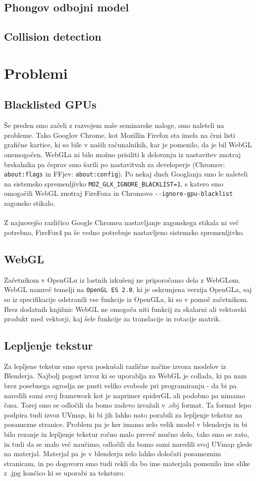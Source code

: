 \documentclass[10pt,a4paper]{article}
\begin{document}
\subsection{Phongov odbojni model}
\subsection{Collision detection}
\pagebreak
\section{Problemi}
\subsection{Blacklisted GPUs}
Še preden smo začeli z razvojem naše seminarske naloge, smo naleteli na probleme.
Tako Googlov Chrome, kot Mozillin Firefox sta imela na črni listi grafične kartice,
ki so bile v naših računalnikih, kar je pomenilo, da je bil WebGL onemogočen. 
WebGLa ni bilo možno prisiliti k delovanju iz nastavitev znotraj brskalnika pa 
čeprav smo šarili po nastavitvah za developerje (Chromov: \verb|about:flags| in FFjev: \verb|about:config|).
Po nekaj dneh Googlanja smo le naleteli na sistemsko spremenljivko \verb|MOZ_GLX_IGNORE_BLACKLIST=1|,
s katero smo omogočili WebGL znotraj FireFoxa in Chromovo \verb|--ignore-gpu-blacklist| zagonsko stikalo.\\\\
Z najnovejšo različico Google Chromea nastavljanje zagonskega stikala ni več potrebno, 
FireFox4 pa še vedno potrebuje nastavljeno sistemsko spremenljivko.
\subsection{WebGL}
Začetnikom v OpenGLu iz lastnih izkušenj ne priporočamo dela z WebGLom. WebGL namreč temelji
na \verb|OpenGL ES 2.0|, ki je oskrunjena verzija OpenGLa, saj so iz specifikacije odstranili
vse funkcije iz OpenGLa, ki so v pomoč začetnikom. Brez dodatnih knjižnic WebGL ne
omogoča niti funkcij za skalarni ali vektorski produkt med vektorji, kaj šele funkcije
za translacije in rotacije matrik.
\subsection{Lepljenje tekstur}
Za lepljene tekstur smo sprva poskušali različne načine izvoza modelov iz Blenderja. Najbolj pogost izvoz ki se uporablja za WebGL je collada, ki pa nam brez posebnega ogrodja ne pusti veliko svobode pri programiranju - da bi pa naredili sami  svoj framework kot je naprimer spiderGL ali podobno pa nimamo časa. Torej smo se odločili da bomo zadevo izvažali v .obj format. Ta format lepo podpira tudi izvoz UVmap, ki bi jih lahko nato porabili za lepljenje tekstur na posamezne stranice.
Problem pa je ker imamo zelo velik model v blenderju in bi bilo rezanje in lepljenje tekstur ročno malo preveč mučno delo, tako smo se zato, in tudi da se malo več naučimo, odločili da bomo sami naredili svoj UVmap glede na materjal. Materjal pa je v blenderju zelo lahko določati posameznim stranicam, in po dogovoru smo tudi rekli da bo ime materjala pomenilo ime slike z .jpg končico ki se uporabi za teksturo.\\
\end{document}
